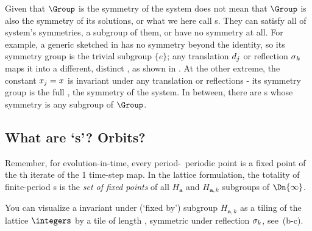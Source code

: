 Given that $\Group$ is the {symmetry} of the system does not mean that
$\Group$ is also the symmetry of its solutions, or what we here call {\em
\lattstate}s.
They can satisfy
all of system's symmetries, a subgroup of them, or have no symmetry at
all.
For example, a generic {\lattstate}  sketched in
 has no symmetry beyond the identity, so its
symmetry group is the trivial subgroup $\{e\}$; any translation
$d_j$ or reflection $\sigma_k$ maps it into a different, distinct
{\lattstate}, as shown in .
At the other extreme, the constant {\lattstate}
$x_j=x$ is invariant under any translation or reflections - its
symmetry group is the full \Group, the symmetry of the system. In
between, there are {\lattstate}s whose symmetry is any subgroup of
$\Group$.

\subsection{What are `{\lattstate}s'? Orbits?}
\label{s:LattStates}

Remember, for evolution-in-time, every period-\cl{}\ periodic point is a
fixed point of the \cl{}th iterate of the 1 time-step map. In the lattice
formulation, the totality of finite-period {\lattstate}s is the \emph{set
of fixed points} of all  $H_{\mathbf{a}}$ and  $H_{\mathbf{a},k}$
subgroups of $\Dn{\infty}$.

You can visualize a {\lattstate} invariant under (`fixed by') subgroup
$H_{\mathbf{a},k}$ as a tiling of the lattice $\integers$ by a
{\lattstate} tile of length \cl{}, symmetric under reflection $\sigma_k$,
see \,(b-c).

